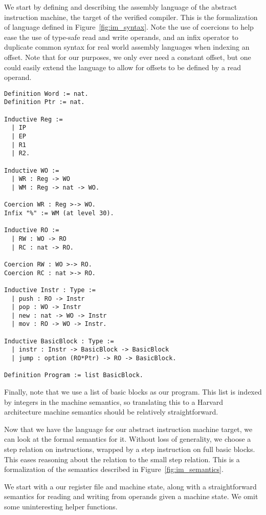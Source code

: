 We start by defining and describing the assembly language of the abstract
instruction machine, the target of the verified compiler. This is the
formalization of language defined in Figure~\ref{fig:im_syntax}. Note the use of
coercions to help ease the use of type-safe read and write operands, and an
infix operator to duplicate common syntax for real world assembly languages when
indexing an offset. Note that for our purposes, we only ever need a constant
offset, but one could easily extend the language to allow for offsets to be
defined by a read operand.  

\begin{verbatim}
Definition Word := nat.
Definition Ptr := nat.

Inductive Reg := 
  | IP
  | EP
  | R1
  | R2.

Inductive WO := 
  | WR : Reg -> WO
  | WM : Reg -> nat -> WO.

Coercion WR : Reg >-> WO.
Infix "%" := WM (at level 30).

Inductive RO := 
  | RW : WO -> RO
  | RC : nat -> RO.

Coercion RW : WO >-> RO.
Coercion RC : nat >-> RO.

Inductive Instr : Type :=
  | push : RO -> Instr
  | pop : WO -> Instr
  | new : nat -> WO -> Instr 
  | mov : RO -> WO -> Instr.

Inductive BasicBlock : Type :=
  | instr : Instr -> BasicBlock -> BasicBlock
  | jump : option (RO*Ptr) -> RO -> BasicBlock.

Definition Program := list BasicBlock.
\end{verbatim}

Finally, note that we use a list of basic blocks as our program. This list is
indexed by integers in the machine semantics, so translating this to a Harvard 
architecture machine semantics should be relatively straightforward. 

Now that we have the language for our abstract instruction machine target, we
can look at the formal semantics for it. Without loss of generality, we choose a
step relation on instructions, wrapped by a step instruction on full basic
blocks. This eases reasoning about the relation to the small step \ce
relation. This is a formalization of the semantics described in
Figure~\ref{fig:im_semantics}. 

We start with a our register file and machine state, along with a
straightforward semantics for reading and writing from operands given a 
machine state. We omit some uninteresting helper functions. 


